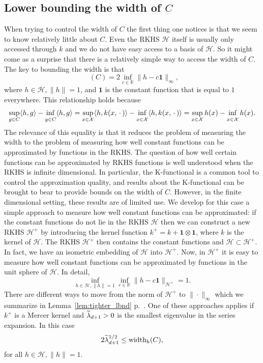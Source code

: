 \documentclass[AHL,Unicode,longabstracts,published]{cedram}
\theoremstyle{remark}
\DeclareMathOperator*{\infd}{inf\vphantom{p}}
\DeclareMathOperator{\diamh}{{width}_h}
\newcommand{\R}{\mathbb{R}}
\newcommand{\X}{\mathcal{X}}
\newcommand{\cH}{\mathcal{H}}
\let\oldtilde\tilde
\renewcommand*{\tilde}[1]{\mathchoice{\widetilde{#1}}{\widetilde{#1}}{\oldtilde{#1}}{\oldtilde{#1}}}
\begin{document}
\subsection{Lower bounding the width of \texorpdfstring{$C$}{C}}

When trying to control the width of $C$ the first thing one notices is that we seem to know relatively little about $C$. Even the RKHS $\cH$ itself is usually only accessed through $k$ and we do not have easy access to a basis of $\cH$. So it might come as a surprise that there is a relatively simple way to access the width of $C$. The key to bounding the width is that
\begin{equation*}
\diamh(C) = 2 \inf_{c\in \R} \|h - c \bm 1\|_\infty,
\end{equation*}
where $h\in \cH, \|h\|=1$, and $\bm 1$ is the constant function that is equal to $1$ everywhere. This relationship holds because
\begin{align*}
\sup_{g \in C} \langle h,g \rangle -\infd_{g\in C} \langle h,g \rangle = \sup_{x \in \X} \langle h, k(x,\,\cdot\,) \rangle -\infd_{x \in \X} \langle h, k(x,\,\cdot\,) \rangle = \sup_{x\in \X} h(x) - \infd_{x \in \X} h(x).
\end{align*}
The relevance of this equality is that it reduces the problem of measuring the width to the problem of measuring how well constant functions can be approximated by functions in the RKHS. The question of how well certain functions can be approximated by RKHS functions is well understood when the RKHS is infinite dimensional. In particular, the K-functional is a common tool to control the approximation quality, and results about the K-functional can be brought to bear to provide bounds on the width of $C$. However, in the finite dimensional setting, these results are of limited use. We develop for this case a simple approach to measure how well constant functions can be approximated: if the constant functions do not lie in the RKHS $\cH$ then we can construct a new RKHS $\cH^+$ by introducing the kernel function $k^+ = k + \bm 1 \otimes \bm 1$, where $k$ is the kernel of $\cH$. The RKHS $\cH^+$ then contains the constant functions and $\cH \subset \cH^+$. In fact, we have an isometric embedding of $\cH$ into $\cH^+$. Now, in $\cH^+$ it is easy to measure how well constant functions can be approximated by functions in the unit sphere of $\cH$. In detail,
\[
\inf_{h \in \cH, \|h\|=1} \inf_{c\in \R} \|h - c\bm 1\|_{\cH^+} = 1.
\]
There are different ways to move from the norm of $\cH^+$ to $\|\cdot\|_\infty$ which we summarize in Lemma~\ref{lem:tighter_lbnd} p.~\pageref{lem:tighter_lbnd}. One of these approaches applies if $k^+$ is a Mercer kernel and $\tilde \lambda_{d+1} > 0$ is the smallest eigenvalue in the series expansion. In this case
\[
2 \tilde \lambda_{d+1}^{1/2} \leq \diamh(C),
\]
for all $h\in \cH, \|h\|=1$.
\end{document}
